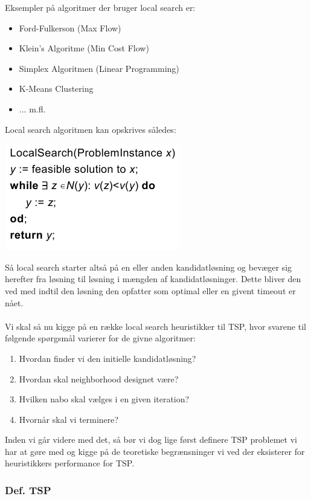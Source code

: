  Eksempler på algoritmer der bruger local search er:
\begin{itemize}
 \item Ford-Fulkerson (Max Flow)
 \item Klein's Algoritme (Min Cost Flow)
 \item Simplex Algoritmen (Linear Programming)
 \item K-Means Clustering
 \item ... m.fl.
\end{itemize}
Local search algoritmen kan opskrives således:
\begin{center}
 \includegraphics[bb=0 0 218 132]{img/localSearch.png}
\end{center}
Så local search starter altså på en eller anden kandidatløsning og bevæger sig herefter fra løsning til løsning i mængden af kandidatløsninger. Dette bliver den ved med indtil den løsning den opfatter som optimal eller en givent timeout er nået.\\
~\\
Vi skal så nu kigge på en række local search heuristikker til TSP, hvor svarene til følgende spørgsmål varierer for de givne algoritmer:
\begin{enumerate}
 \item Hvordan finder vi den initielle kandidatløsning?
 \item Hvordan skal neighborhood designet være?
 \item Hvilken nabo skal vælges i en given iteration?
 \item Hvornår skal vi terminere?
\end{enumerate}

Inden vi går videre med det, så bør vi dog lige først definere TSP problemet vi har at gøre med og kigge på de teoretiske begrænsninger vi ved der eksisterer for heuristikkers performance for TSP.

\subsubsection{Def. TSP}

